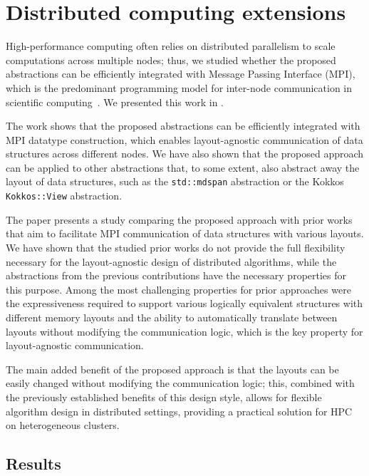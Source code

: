 \section{Distributed computing extensions}\label{sec:layout-agnostic}

High-performance computing often relies on distributed parallelism to scale computations across multiple nodes; thus, we studied whether the proposed abstractions can be efficiently integrated with Message Passing Interface (MPI), which is the predominant programming model for inter-node communication in scientific computing~\cite{mpi-5.0,laguna2019large}. We presented this work in .

The work shows that the proposed abstractions can be efficiently integrated with MPI datatype construction, which enables layout-agnostic communication of data structures across different nodes. We have also shown that the proposed approach can be applied to other abstractions that, to some extent, also abstract away the layout of data structures, such as the \cpp \lstinline{std::mdspan} abstraction or the Kokkos \lstinline{Kokkos::View} abstraction.

The paper presents a study comparing the proposed approach with prior works that aim to facilitate MPI communication of data structures with various layouts. We have shown that the studied prior works do not provide the full flexibility necessary for the layout-agnostic design of distributed algorithms, while the abstractions from the previous contributions have the necessary properties for this purpose. Among the most challenging properties for prior approaches were the expressiveness required to support various logically equivalent structures with different memory layouts and the ability to automatically translate between layouts without modifying the communication logic, which is the key property for layout-agnostic communication.

The main added benefit of the proposed approach is that the layouts can be easily changed without modifying the communication logic; this, combined with the previously established benefits of this design style, allows for flexible algorithm design in distributed settings, providing a practical solution for HPC on heterogeneous clusters.


\subsection{Results}\label{sec:layout-agnostic-results}

